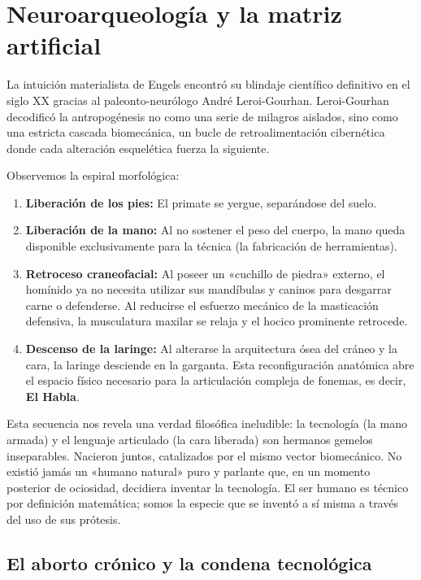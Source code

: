 \section{Neuroarqueología y la matriz artificial}

La intuición materialista de Engels encontró su blindaje científico definitivo en el siglo XX gracias al paleonto-neurólogo André Leroi-Gourhan. Leroi-Gourhan decodificó la antropogénesis no como una serie de milagros aislados, sino como una estricta cascada biomecánica, un bucle de retroalimentación cibernética donde cada alteración esquelética fuerza la siguiente.

Observemos la espiral morfológica:
\begin{enumerate}
    \item \textbf{Liberación de los pies:} El primate se yergue, separándose del suelo.
    \item \textbf{Liberación de la mano:} Al no sostener el peso del cuerpo, la mano queda disponible exclusivamente para la técnica (la fabricación de herramientas).
    \item \textbf{Retroceso craneofacial:} Al poseer un «cuchillo de piedra» externo, el homínido ya no necesita utilizar sus mandíbulas y caninos para desgarrar carne o defenderse. Al reducirse el esfuerzo mecánico de la masticación defensiva, la musculatura maxilar se relaja y el hocico prominente retrocede.
    \item \textbf{Descenso de la laringe:} Al alterarse la arquitectura ósea del cráneo y la cara, la laringe desciende en la garganta. Esta reconfiguración anatómica abre el espacio físico necesario para la articulación compleja de fonemas, es decir, \textbf{El Habla}.
\end{enumerate}

Esta secuencia nos revela una verdad filosófica ineludible: la tecnología (la mano armada) y el lenguaje articulado (la cara liberada) son hermanos gemelos inseparables. Nacieron juntos, catalizados por el mismo vector biomecánico. No existió jamás un «humano natural» puro y parlante que, en un momento posterior de ociosidad, decidiera inventar la tecnología. El ser humano es técnico por definición matemática; somos la especie que se inventó a sí misma a través del uso de sus prótesis.

\subsection{El aborto crónico y la condena tecnológica}


